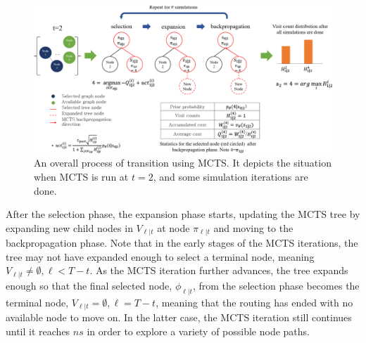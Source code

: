 \documentclass{article}
\begin{document}
\begin{figure}
  \centering
  \includegraphics[width=0.94\linewidth]{figures/MCTS detail - fixed.png}
  \caption{An overall process of transition using MCTS. It depicts the situation when MCTS is run at $t=2$, and some simulation iterations are done. }
  \label{fig:MCTS}
\end{figure}

After the selection phase, the expansion phase starts, updating the MCTS tree by expanding new child nodes in $V_{\ell|t}$ at node $\pi_{\ell | t}$ and moving to the backpropagation phase. Note that in the early stages of the MCTS iterations, the tree may not have expanded enough to select a terminal node, meaning $V_{\ell|t} \neq \emptyset, \ell<T-t$. As the MCTS iteration further advances, the tree expands enough so that the final selected node, $\phi_{\ell|t}$, from the selection phase becomes the terminal node, $V_{\ell|t}=\emptyset, \ell=T-t$, meaning that the routing has ended with no available node to move on. In the latter case, the MCTS iteration still continues until it reaches $ns$ in order to explore a variety of possible node paths.


\end{document}
